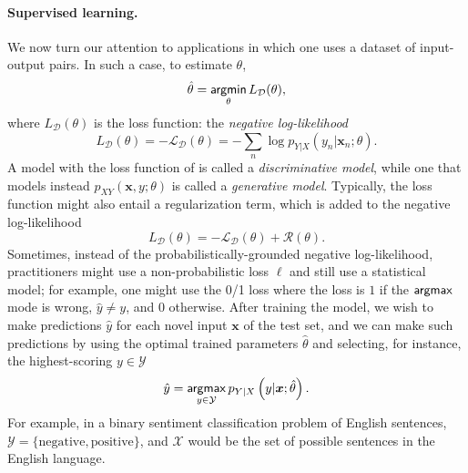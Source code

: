 \paragraph*{Supervised learning.} We now turn our attention to applications
in which one uses a dataset of input-output pairs. In such a case,
to estimate $\theta$,
%
\begin{equation}
    \hat{\theta} = \operatorname*{\mathsf{argmin}}_\theta L_\mathcal{D}(\theta),
\end{equation}
%
where $L_\mathcal{D}(\theta)$ is the loss function:
the \textit{negative log-likelihood}
%
\begin{equation}
    L_\mathcal{D}(\theta) = -\mathcal{L}_\mathcal{D}(\theta) =
    - \sum_n \log p_{Y|X}(y_n|\bm{x}_n; \theta).
    \label{eq:discr-loss}
\end{equation}
%
A model with the loss function of  is called a
\textit{discriminative model}, while one that models instead
$p_{XY}(\bm{x}, y; \theta)$ is called a \textit{generative model}.
Typically, the loss function might also entail a regularization term,
which is added to the negative log-likelihood
%
\begin{equation}
    L_\mathcal{D}(\theta) = -\mathcal{L}_\mathcal{D}(\theta) + \mathcal{R}(\theta).
\end{equation}
%
Sometimes, instead of the probabilistically-grounded negative
log-likelihood, practitioners might use a non-probabilistic loss $\ell$ and
still use a statistical model; for example, one might use the 0/1
loss where the loss is $1$ if the $\operatorname*{\mathsf{argmax}}$ mode is wrong, \ie
$\hat{y}\neq y$, and $0$ otherwise. After training the model, we wish
to make predictions $\hat{y}$ for each novel input $\bm{x}$ of the
test set, and we can make such predictions by using the optimal
trained parameters $\hat{\theta}$ and selecting, for instance, the highest-scoring
$y\in\mathcal{Y}$
%
\begin{equation}
    \hat{y}=\operatorname*{\mathsf{argmax}}_{y\in\mathcal{Y}}p_{Y|X}\left(y|\bm{x};\hat{\theta}\right).
\end{equation}
%
For example, in a binary sentiment classification problem of English
sentences, $\mathcal{Y}=\{\text{negative},\text{positive}\}$, and
$\mathcal{X}$ would be the set of possible sentences in the English
language.


